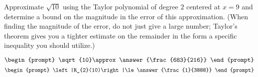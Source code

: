 \documentclass{ximera}
\author{Gregory Hartman \and Matthew Carr}
\begin{document}
\begin{exercise}






Approximate $\sqrt{10}$ using the Taylor polynomial of degree $2$ centered at $x=9$ and determine a bound on the magnitude in the error of this approximation. (When finding the magnitude of the error, do not just give a large number; Taylor's theorem gives you a tighter estimate on the remainder in the form a specific inequality you should utilize.)

\[
\begin{prompt}
\sqrt{10}\approx\answer{\frac{683}{216}}
\end{prompt}
\]
\[
\begin{prompt}
\left|R_{2}(10)\right|\le\answer{\frac{1}{3888}}
\end{prompt}
\]

\end{exercise}
\end{document}
